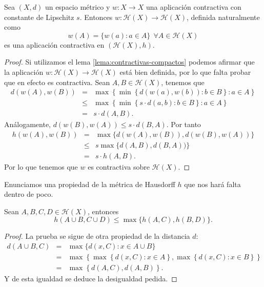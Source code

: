 \begin{lema}
    Sea $(X,d)$ un espacio métrico y $w:X\longrightarrow X$ una aplicación contractiva con constante de Lipschitz $s$. Entonces $w:\mathcal{H}(X)\longrightarrow\mathcal{H}(X)$, definida naturalmente como
    $$
    w(A)=\{w(a):a\in A\}\ \ \forall A\in\mathcal{H}(X)
    $$
    es una aplicación contractiva en $(\mathcal{H}(X),h)$.
\end{lema}
\begin{proof}
    Si utilizamos el lema \ref{lema:contractivas-compactos} podemos afirmar que la aplicación $w:\mathcal{H}(X)\longrightarrow\mathcal{H}(X)$ está bien definida, por lo que falta probar que en efecto es contractiva. Sean $A,B\in\mathcal{H}(X)$, tenemos que
    \begin{eqnarray*}
        d(w(A),w(B)) & = & \max\left\lbrace \min \left\lbrace d(w(a),w(b)): b\in B\right\rbrace : a\in A \right\rbrace \\
                     & \leq &  \max\left\lbrace \min \left\lbrace s\cdot d(a,b): b\in B\right\rbrace : a\in A \right\rbrace \\
                     & = & s\cdot d(A,B).
    \end{eqnarray*}
    Análogamente, $d(w(B),w(A))\leq s\cdot d(B,A)$. Por tanto
    \begin{eqnarray*}
        h(w(A),w(B)) & = & \max \{d(w(A),w(B)), d(w(B),w(A))\} \\
                     & \leq & s \max \{d(A,B), d(B,A))\} \\
                     & = & s\cdot h(A,B).
    \end{eqnarray*}
    Por lo que tenemos que $w$ es contractiva sobre $\mathcal{H}(X)$.
\end{proof}

Enunciamos una propiedad de la métrica de Hausdorff $h$ que nos hará falta dentro de poco.

\begin{lema}
    \label{lema:uniones}
    Sean $A,B,C,D\in\mathcal{H}(X)$, entonces 
    $$h(A\cup B, C\cup D)\leq\max\{h(A,C),h(B,D)\}.$$
\end{lema}
\begin{proof}
    La prueba se sigue de otra propiedad de la distancia $d$:
    \begin{eqnarray*}
    d(A\cup B,C) & = & \max\{d(x,C) : x\in A\cup B\} \\
                 & = & \max\left\lbrace \max\left\lbrace d(x,C):x\in A \right\rbrace, \max\left\lbrace d(x,C):x\in B \right\rbrace\right\rbrace \\
                 & = & \max\left\lbrace d(A,C),d(A,B) \right\rbrace.
    \end{eqnarray*}
    Y de esta igualdad se deduce la desigualdad pedida.
\end{proof}


